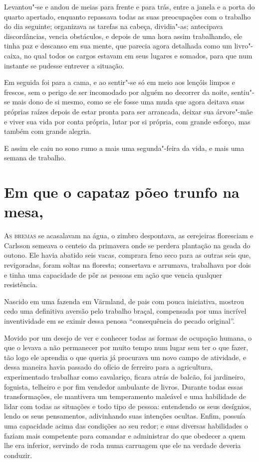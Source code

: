 Levantou"-se e andou de meias para frente e para trás, entre a janela e a
porta do quarto apertado, enquanto repassava todas as suas preocupações com o
trabalho do dia seguinte; organizava as tarefas na cabeça, dividia"-as;
antecipava discordâncias, vencia obstáculos, e depois de uma hora assim
trabalhando, ele tinha paz e descanso em sua mente, que parecia agora detalhada
como um livro"-caixa, no qual todos os cargos estavam em seus lugares e
somados, para que num instante se pudesse entrever a situação.

Em seguida foi para a cama, e ao sentir"-se só em meio aos lençóis limpos e
frescos, sem o perigo de ser incomodado por alguém no decorrer da noite,
sentiu"-se mais dono de si mesmo, como se ele fosse uma muda que agora deitava
suas próprias raízes depois de estar pronta para ser arrancada, deixar sua
árvore"-mãe e viver sua vida por conta própria, lutar por si própria, com grande
esforço, mas também com grande alegria.

E assim ele caiu no sono rumo a mais uma segunda"-feira da vida, e mais
uma semana de trabalho.

\chapter[Em que o capataz põe o trunfo na mesa\ldots]{Em que o capataz põe\break o trunfo na mesa,
}

\textsc{As bremas} se acasalavam na água, o zimbro despontava, as cerejeiras
floresciam e Carlsson semeava o centeio da primavera onde se perdera plantação
na geada do outono. Ele havia abatido seis vacas, comprara feno seco para as outras seis
que, revigoradas, foram soltas na floresta; consertava e arrumava, trabalhava
por dois e tinha uma capacidade de pôr as pessoas em ação que vencia qualquer
resistência.

Nascido em uma fazenda em Värmland, de pais com pouca iniciativa, mostrou cedo
uma definitiva aversão pelo trabalho braçal, compensada por uma incrível
inventividade em se eximir dessa penosa ``consequência do pecado original''.

Movido por um desejo de ver e conhecer todas as formas de ocupação humana, o que
o levava a não permanecer por muito tempo num lugar sem ter o que fazer, tão
logo ele aprendia o que queria já procurava um novo campo de atividade, e dessa
maneira havia passado do ofício de ferreiro para a agricultura, experimentado
trabalhar como cavalariço, ficara atrás de balcão, foi jardineiro,
foguista, telheiro e por fim vendedor ambulante de livros. Durante todas essas
transformações, ele mantivera um temperamento maleável e uma habilidade de lidar
com todas as situações e todo tipo de pessoa: entendendo os seus desígnios,
lendo os seus pensamentos, adivinhando suas intenções ocultas. Enfim, possuía
uma capacidade acima das condições ao seu redor; e suas diversas habilidades o
faziam mais competente para comandar e administrar do que obedecer a quem lhe
era inferior, servindo de roda numa carruagem que ele na verdade deveria
conduzir.

